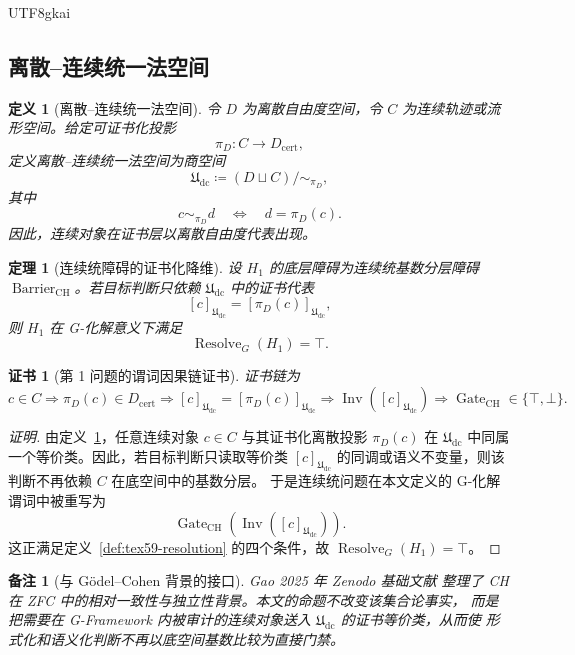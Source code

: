 \documentclass[12pt]{article}
\newtheorem{definition}{定义}[section]
\newtheorem{theorem}{定理}[section]
\newtheorem{remark}{备注}[section]
\newtheorem{Certificate}{证书}[section]
\newcommand{\GFramework}{\textsf{G-Framework}}
\newcommand{\Udc}{\mathfrak{U}_{\mathrm{dc}}}
\newcommand{\DefEq}{\coloneqq}
\DeclareMathOperator{\Resolve}{Resolve}
\DeclareMathOperator{\Barrier}{Barrier}
\DeclareMathOperator{\Gate}{Gate}
\DeclareMathOperator{\Inv}{Inv}
\DeclareMathOperator{\CH}{CH}
\begin{document}
\begin{CJK*}{UTF8}{gkai}
\subsection{离散--连续统一法空间}
\label{subsec:tex59-udc}

\begin{definition}[离散--连续统一法空间]
\label{def:tex59-udc}
令 \(D\) 为离散自由度空间，令 \(C\) 为连续轨迹或流形空间。给定可证书化投影
\[
  \pi_D:C\longrightarrow D_{\mathrm{cert}},
\]
定义离散--连续统一法空间为商空间
\[
  \Udc
  \DefEq
  (D\sqcup C)/\sim_{\pi_D},
\]
其中
\[
  c\sim_{\pi_D}d
  \quad\Longleftrightarrow\quad
  d=\pi_D(c).
\]
因此，连续对象在证书层以离散自由度代表出现。
\end{definition}

\begin{theorem}[连续统障碍的证书化降维]
\label{thm:tex59-ch-resolution}
设 \(H_1\) 的底层障碍为连续统基数分层障碍 \(\Barrier_{\CH}\)。若目标判断只依赖
\(\Udc\) 中的证书代表
\[
  [c]_{\Udc}=[\pi_D(c)]_{\Udc},
\]
则 \(H_1\) 在 G-化解意义下满足
\[
  \Resolve_G(H_1)=\top.
\]
\end{theorem}

\begin{Certificate}[第 1 问题的谓词因果链证书]
\label{cert:tex59-ch}
证书链为
\[
  c\in C
  \Longrightarrow
  \pi_D(c)\in D_{\mathrm{cert}}
  \Longrightarrow
  [c]_{\Udc}=[\pi_D(c)]_{\Udc}
  \Longrightarrow
  \Inv([c]_{\Udc})
  \Longrightarrow
  \Gate_{\CH}\in\{\top,\bot\}.
\]
\end{Certificate}

\begin{proof}[证明]
由定义~\ref{def:tex59-udc}，任意连续对象 \(c\in C\) 与其证书化离散投影
\(\pi_D(c)\) 在 \(\Udc\) 中同属一个等价类。因此，若目标判断只读取等价类
\([c]_{\Udc}\) 的同调或语义不变量，则该判断不再依赖 \(C\) 在底空间中的基数分层。
于是连续统问题在本文定义的 G-化解谓词中被重写为
\[
  \Gate_{\CH}(\Inv([c]_{\Udc})).
\]
这正满足定义~\ref{def:tex59-resolution} 的四个条件，故
\(\Resolve_G(H_1)=\top\)。
\end{proof}

\begin{remark}[与 Gödel--Cohen 背景的接口]
Gao 2025 年 Zenodo 基础文献 \cite{Gao2025PureMathZenodo,Godel1940,Cohen1963,Jech2003}
整理了 CH 在 ZFC 中的相对一致性与独立性背景。本文的命题不改变该集合论事实，
而是把需要在 \GFramework{} 内被审计的连续对象送入 \(\Udc\) 的证书等价类，从而使
形式化和语义化判断不再以底空间基数比较为直接门禁。
\end{remark}


\end{CJK*}
\end{document}
